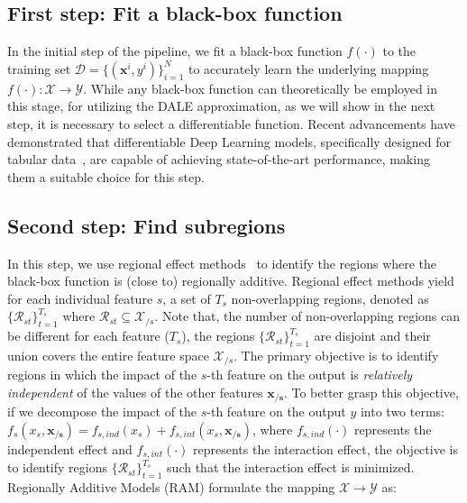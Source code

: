 \documentclass[12pt]{article}
\newcommand{\xb}{\mathbf{x}}
\newcommand{\xcc}{\mathbf{x_{/s}}}
\newcommand{\Xcal}{\mathcal{X}}
\newcommand{\Ycal}{\mathcal{Y}}
\begin{document}
\subsection{First step: Fit a black-box function}
\label{subsec:fit_black_box}

In the initial step of the pipeline, we fit a black-box function \(f(\cdot)\) to the training set
\(\mathcal{D} = \{(\xb^i, y^i)\}_{i=1}^N\) to accurately learn the underlying mapping \(f(\cdot) : \Xcal \rightarrow \Ycal\).
While any black-box function can theoretically be employed in this stage,
for utilizing the DALE approximation, as we will show in the next step,
it is necessary to select a differentiable function.
Recent advancements have demonstrated that differentiable Deep Learning models,
specifically designed for tabular data~\citep{arik2021tabnet}, are capable of achieving state-of-the-art performance,
making them a suitable choice for this step.

\subsection{Second step: Find subregions}
\label{subsec:regional_effect_methods}

In this step, we use regional effect methods~\citep{herbinger2023decomposing, herbinger2022repid}
to identify the regions where the black-box function is (close to) regionally additive.
Regional effect methods yield for each individual feature \(s\), a set of \(T_s\) non-overlapping regions,
denoted as \(\{\mathcal{R}_{st}\}_{t=1}^{T_s}\) where \(\mathcal{R}_{st} \subseteq \Xcal_{/s}\).
Note that, the number of non-overlapping regions can be different for each feature ($T_s$),
the regions \(\{\mathcal{R}_{st}\}_{t=1}^{T_s}\) are disjoint
and their union covers the entire feature space \(\Xcal_{/s}\).
The primary objective is to identify regions in which the impact of the \(s\)-th feature on the output is
\textit{relatively independent} of the values of the other features \(\xcc\).
To better grasp this objective, if we decompose the impact of the \(s\)-th feature on the output $y$ into two terms:
\(f_s(x_s, \xcc) = f_{s,ind}(x_s) + f_{s, int}(x_s, \xcc)\),
where \(f_{s,ind}(\cdot)\) represents the independent effect
and \(f_{s, int}(\cdot)\) represents the interaction effect,
the objective is to identify regions \(\{\mathcal{R}_{st}\}_{t=1}^{T_s}\) such that the interaction effect is minimized.
Regionally Additive Models (RAM) formulate the mapping \(\mathcal{X} \rightarrow \mathcal{Y}\) as:
\end{document}
